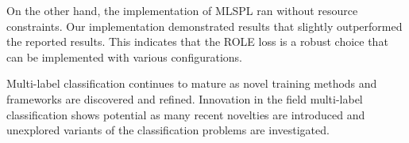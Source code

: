 \documentclass[lettersize,journal]{IEEEtran}
\begin{document}
On the other hand, the implementation of MLSPL ran without resource constraints. Our implementation demonstrated results that slightly outperformed the reported results. This indicates that the ROLE loss is a robust choice that can be implemented with various configurations. 

Multi-label classification continues to mature as novel training methods and frameworks are discovered and refined.  Innovation in the field multi-label classification shows potential as many recent novelties are introduced and unexplored variants of the classification problems are investigated. 





\end{document}
